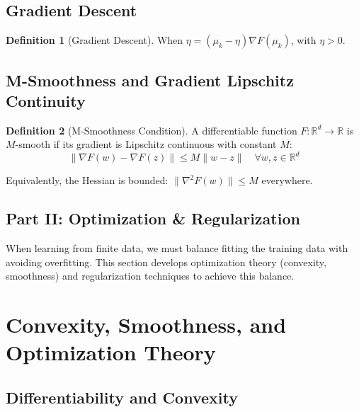 \documentclass[12pt,a4paper]{article}
\theoremstyle{definition}
\newtheorem{definition}{Definition}[section]
\begin{document}
\subsection{Gradient Descent}

\begin{definition}[Gradient Descent]
When $\eta = (\mu_k - \eta) \nabla F(\mu_k)$, with $\eta > 0$.
\end{definition}

\subsection{M-Smoothness and Gradient Lipschitz Continuity}

\begin{definition}[M-Smoothness Condition]
A differentiable function $F: \mathbb{R}^d \to \mathbb{R}$ is $M$-smooth if its gradient is Lipschitz continuous with constant $M$:
\[
\|\nabla F(w) - \nabla F(z)\| \leq M \|w - z\| \quad \forall w, z \in \mathbb{R}^d
\]

Equivalently, the Hessian is bounded: $\|\nabla^2 F(w)\| \leq M$ everywhere.
\end{definition}

\newpage


\newpage
\vspace*{2cm}
\begin{center}
    \section*{\Large Part II: Optimization \& Regularization}
\end{center}
\vspace*{1cm}
\nobreak

When learning from finite data, we must balance fitting the training data with avoiding overfitting. This section develops optimization theory (convexity, smoothness) and regularization techniques to achieve this balance.

\newpage

\section{Convexity, Smoothness, and Optimization Theory}

\subsection{Differentiability and Convexity}
\end{document}
